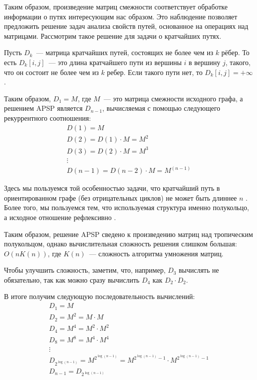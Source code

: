 Таким образом, произведение матриц смежности соответствует обработке информации о путях интересующим нас образом.
Это наблюдение позволяет предложить решение задач анализа свойств путей, основанное на операциях над матрицами.
Рассмотрим такое решение для задачи о кратчайших путях.

Пусть $D_k$~--- матрица кратчайших путей, состоящих не более чем из $k$ рёбер.
То есть $D_k[i, j]$~--- это длина кратчайшего пути из вершины $i$ в вершину $j$, такого, что он состоит не более чем из $k$ ребер.
Если такого пути нет, то $D_k[i, j] = +\infty$.

Таким образом, $D_1 = M$, где $M$~--- это матрица смежности исходного графа, а решением APSP является $D_{n-1}$, вычисляемая с помощью следующего рекуррентного соотношения:
\begin{gather*}
    D(1) = M \\
    D(2) = D(1) \cdot M = M^2 \\
    D(3) = D(2) \cdot M = M^3 \\
    \vdots \\
    D(n - 1) = D(n - 2) \cdot M = M^{(n - 1)}
\end{gather*}

Здесь мы пользуемся той особенностью задачи, что кратчайший путь в ориентированном графе (без отрицательных циклов) не может быть длиннее $n$%
.
Более того, мы пользуемся тем, что используемая структура именно полукольцо, а исходное отношение рефлексивно%
.

Таким образом, решение APSP сведено к произведению матриц над тропическим полукольцом, однако вычислительная сложность решения слишком большая: $O(n K(n))$, где $K(n)$~--- сложность алгоритма умножения матриц.

Чтобы улучшить сложность, заметим, что, например, $D_3$ вычислять не обязательно, так как можно сразу вычислить $D_4$ как $D_2 \cdot D_2$.

В итоге получим следующую последовательность вычислений:
\begin{gather*}
    D_1 = M \\
    D_2 = M^2 = M \cdot M \\
    D_4 = M^4 = M^2 \cdot M^2 \\
    D_8 = M^8 = M^4 \cdot M^4 \\
    \vdots \\
    D_{2^{\log(n-1)}} = M^{2^{\log(n-1)}} = M^{2^{\log(n-1)} - 1} \cdot M^{2^{\log(n-1)} - 1} \\
    D_{n-1} = D_{2^{\log(n-1)}}
\end{gather*}


